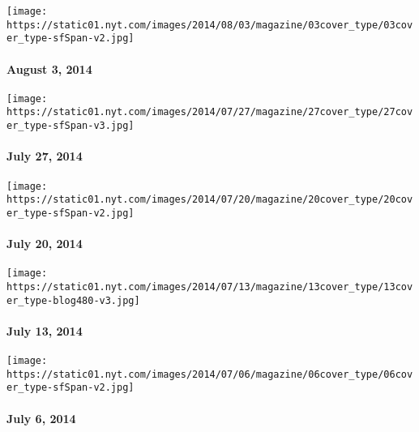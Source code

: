 \href{http://www.nytimes.com/indexes/2014/08/03/magazine/index.html}{}

\texttt{[image: https://static01.nyt.com/images/2014/08/03/magazine/03cover\_type/03cover\_type-sfSpan-v2.jpg]}

\hypertarget{august-3-2014}{%
\paragraph{August 3, 2014}\label{august-3-2014}}

\href{http://www.nytimes.com/indexes/2014/07/27/magazine/index.html}{}

\texttt{[image: https://static01.nyt.com/images/2014/07/27/magazine/27cover\_type/27cover\_type-sfSpan-v3.jpg]}

\hypertarget{july-27-2014}{%
\paragraph{July 27, 2014}\label{july-27-2014}}

\href{http://www.nytimes.com/indexes/2014/07/20/magazine/index.html}{}

\texttt{[image: https://static01.nyt.com/images/2014/07/20/magazine/20cover\_type/20cover\_type-sfSpan-v2.jpg]}

\hypertarget{july-20-2014}{%
\paragraph{July 20, 2014}\label{july-20-2014}}

\href{http://www.nytimes.com/indexes/2014/07/13/magazine/index.html}{}

\texttt{[image: https://static01.nyt.com/images/2014/07/13/magazine/13cover\_type/13cover\_type-blog480-v3.jpg]}

\hypertarget{july-13-2014}{%
\paragraph{July 13, 2014}\label{july-13-2014}}

\href{http://www.nytimes.com/indexes/2014/07/06/magazine/index.html}{}

\texttt{[image: https://static01.nyt.com/images/2014/07/06/magazine/06cover\_type/06cover\_type-sfSpan-v2.jpg]}

\hypertarget{july-6-2014}{%
\paragraph{July 6, 2014}\label{july-6-2014}}


